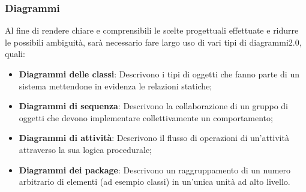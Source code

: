\subsubsection{Diagrammi}
Al fine di rendere chiare e comprensibili le scelte progettuali effettuate e ridurre le possibili ambiguità, sarà necessario fare largo uso di vari tipi di diagrammi2.0, quali:
\begin{itemize}
	\item \textbf{Diagrammi delle classi}: Descrivono i tipi di oggetti che fanno parte di un sistema mettendone in evidenza le relazioni statiche;
	\item \textbf{Diagrammi di sequenza}: Descrivono la collaborazione di un gruppo di oggetti che devono implementare collettivamente un comportamento;
	\item \textbf{Diagrammi di attività}: Descrivono il flusso di operazioni di un'attività attraverso la sua logica procedurale;
	\item \textbf{Diagrammi dei package}: Descrivono un raggruppamento di un numero arbitrario di elementi (ad esempio classi) in un'unica unità ad alto livello.
	
\end{itemize}


